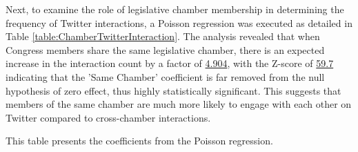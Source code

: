 \documentclass[11pt]{article}
\begin{document}
Next, to examine the role of legislative chamber membership in determining the frequency of Twitter interactions, a Poisson regression was executed as detailed in Table \ref{table:ChamberTwitterInteraction}. The analysis revealed that when Congress members share the same legislative chamber, there is an expected increase in the interaction count by a factor of \hyperlink{results0}{4.904}, with the Z-score of \hyperlink{B1c}{59.7} indicating that the 'Same Chamber' coefficient is far removed from the null hypothesis of zero effect, thus highly statistically significant. This suggests that members of the same chamber are much more likely to engage with each other on Twitter compared to cross-chamber interactions.

\begin{table}[h]
\caption{\protect\hyperlink{file-table-2-pkl}{Test of association between legislative chamber and frequency of Twitter interactions.}}
\label{table:ChamberTwitterInteraction}
\begin{threeparttable}
\renewcommand{\TPTminimum}{\linewidth}
\begin{tablenotes}
\footnotesize
\item This table presents the coefficients from the Poisson regression.

\end{tablenotes}
\end{threeparttable}
\end{table}
\end{document}
